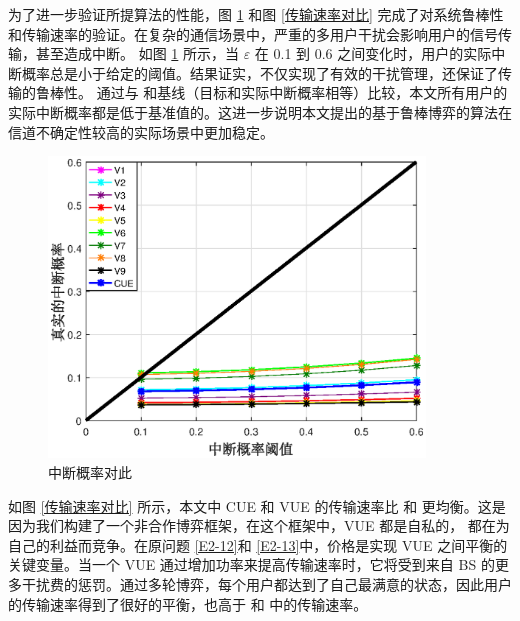 为了进一步验证所提算法的性能，图 \ref{中断概率对此} 和图 \ref{传输速率对比} 完成了对系统鲁棒性和传输速率的验证。在复杂的通信场景中，严重的多用户干扰会影响用户的信号传输，甚至造成中断。
如图 \ref{中断概率对此} 所示，当 $\varepsilon$ 在 0.1 到 0.6 之间变化时，用户的实际中断概率总是小于给定的阈值。结果证实，不仅实现了有效的干扰管理，还保证了传输的鲁棒性。
通过与 \cite{PCID}和基线（目标和实际中断概率相等）比较，本文所有用户的实际中断概率都是低于基准值的。这进一步说明本文提出的基于鲁棒博弈的算法在信道不确定性较高的实际场景中更加稳定。
\begin{figure}[H]
\centering
\includegraphics[width=10cm]{figures//chap2//中断概率.eps}
\caption{中断概率对此}
\label{中断概率对此}
\end{figure}

如图 \ref{传输速率对比} 所示，本文中 CUE 和 VUE 的传输速率比 \cite{PCID}和 \cite{ACAR}更均衡。这是因为我们构建了一个非合作博弈框架，在这个框架中，VUE 都是自私的，
都在为自己的利益而竞争。在原问题 \eqref{E2-12}和 \eqref{E2-13}中，价格是实现 VUE 之间平衡的关键变量。当一个 VUE 通过增加功率来提高传输速率时，它将受到来自 BS 的更
多干扰费的惩罚。通过多轮博弈，每个用户都达到了自己最满意的状态，因此用户的传输速率得到了很好的平衡，也高于 \cite{PCID}和 \cite{ACAR}中的传输速率。

